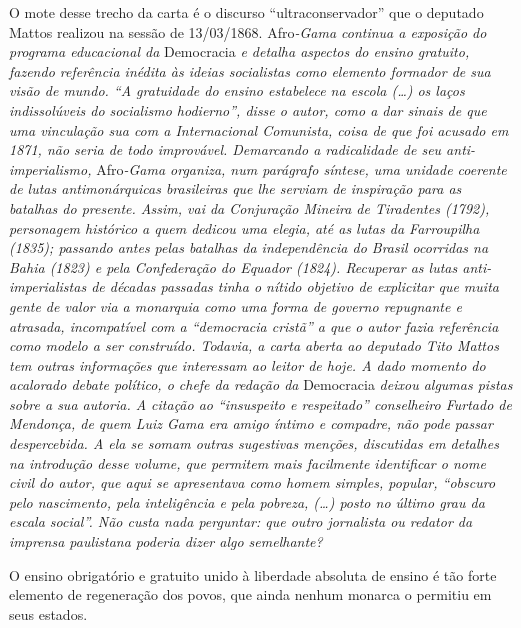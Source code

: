\begin{didascalia}
O mote desse trecho da carta é o discurso ``ultraconservador'' que o
deputado Mattos realizou na sessão de 13/03/1868. Afro\emph{-Gama
continua a exposição do programa educacional da} Democracia \emph{e
detalha aspectos do ensino gratuito, fazendo referência inédita às
ideias socialistas como elemento formador de sua visão de mundo. ``A
gratuidade do ensino estabelece na escola (\ldots{}) os laços indissolúveis
do socialismo hodierno'', disse o autor, como a dar sinais de que uma
vinculação sua com a Internacional Comunista, coisa de que foi acusado
em 1871, não seria de todo improvável. Demarcando a radicalidade de seu
anti-imperialismo,} Afro\emph{-Gama organiza, num parágrafo síntese, uma
unidade coerente de lutas antimonárquicas brasileiras que lhe serviam
de inspiração para as batalhas do presente. Assim, vai da Conjuração
Mineira de Tiradentes (1792), personagem histórico a quem dedicou uma
elegia, até as lutas da Farroupilha (1835); passando antes pelas
batalhas da independência do Brasil ocorridas na Bahia (1823) e pela
Confederação do Equador (1824). Recuperar as lutas anti-imperialistas de
décadas passadas tinha o nítido objetivo de explicitar que muita gente
de valor via a monarquia como uma forma de governo repugnante e
atrasada, incompatível com a ``democracia cristã'' a que o autor fazia
referência como modelo a ser construído. Todavia, a carta aberta ao
deputado Tito Mattos tem outras informações que interessam ao leitor de
hoje. A dado momento do acalorado debate político, o chefe da redação
da} Democracia \emph{deixou algumas pistas sobre a sua autoria. A
citação ao ``insuspeito e respeitado'' conselheiro Furtado de Mendonça, de
quem Luiz Gama era amigo íntimo e compadre, não pode passar
despercebida. A ela se somam outras sugestivas menções, discutidas em
detalhes na introdução desse volume, que permitem mais facilmente
identificar o nome civil do autor, que aqui se apresentava como homem
simples, popular, ``obscuro pelo nascimento, pela inteligência e pela
pobreza, (\ldots{}) posto no último grau da escala social''. Não custa nada
perguntar: que outro jornalista ou redator da imprensa paulistana
poderia dizer algo semelhante?}
\end{didascalia}



O ensino obrigatório e gratuito unido à liberdade absoluta de ensino é
tão forte elemento de regeneração dos povos, que ainda nenhum monarca o
permitiu em seus estados.

